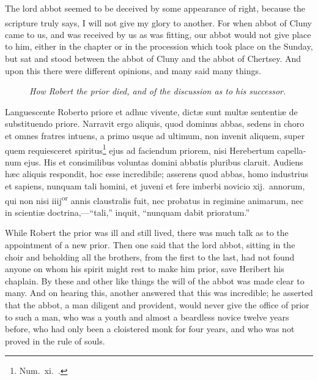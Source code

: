 \documentclass{book}
\newcounter{engnote}
\newcommand{\engnotenum}{\textsuperscript{\arabic{engnote}\stepcounter{engnote}}}
\newcommand{\blockhead}[4][]{
\begin{figure}
\centering
\vspace{#4}
\parbox{2.75cm}{\begin{center}\footnotesize \color{BrickRed} \emph{#2}\\ #1 \end{center}}
\end{figure}
}
\begin{document}
\begin{paracol}{2}
\begin{otherlanguage}{latin}
\end{otherlanguage}

\switchcolumn

The lord abbot seemed to be deceived by some appearance of right, because the scripture truly says, I will not give my glory to another.\engnotenum{} For when abbot of Cluny\engnotenum{} came to us, and was received by us as was fitting, our abbot would not give place to him, either in the chapter or in the procession which took place on the Sunday, but sat and stood between the abbot of Cluny and the abbot of Chertsey. And upon this there were different opinions, and many said many things.

\switchcolumn*

\begin{otherlanguage}{latin}
\blockhead{How Robert the prior died, and of the discussion as to his successor.}{4}{-.45cm}
Languescente Roberto priore et adhuc vivente, dict\ae{} sunt mult\ae{} sententi\ae{} de substituendo priore. Narravit ergo aliquis, quod dominus abbas, sedens in choro et omnes fratres intuens, a primo usque ad ultimum, non invenit aliquem, super quem requiesceret spiritus\footnote[\ddag]{Num.\ xi.\ .} ejus ad faciendum priorem, nisi Herebertum capellanum ejus. His et consimilibus voluntas domini abbatis pluribus claruit. Audiens h\ae{}c aliquis respondit, hoc esse incredibile; asserens quod abbas, homo industrius et sapiens, nunquam tali homini, et juveni et fere imberbi novicio xij.\ annorum, qui non nisi iiij\textsuperscript{or} annis claustralis fuit, nec probatus in regimine animarum, nec in scienti\ae{} doctrina,---``tali,'' inquit, ``nunquam dabit prioratum.''

\end{otherlanguage}

\switchcolumn

While Robert the prior was ill and still lived, there was much talk as to the appointment of a new prior. Then one said that the lord abbot, sitting in the choir and beholding all the brothers, from the first to the last, had not found anyone on whom his spirit might rest to make him prior, save Heribert his chaplain. By these and other like things the will of the abbot was made clear to many. And on hearing this, another answered that this was incredible; he asserted that the abbot, a man diligent and provident, would never give the office of prior to such a man, who was a youth and almost a beardless novice twelve years before, who had only been a cloistered monk for four years, and who was not proved in the rule of souls.


\end{paracol}
\end{document}
